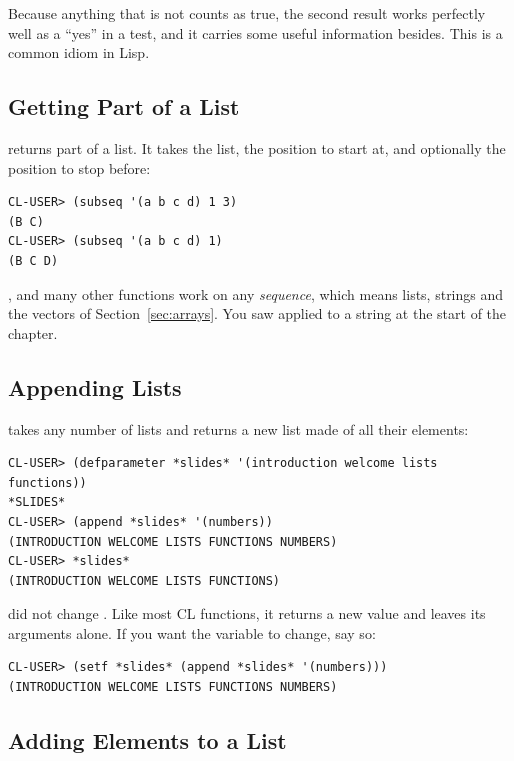 Because anything that is not  counts as true, the second
result works perfectly well as a ``yes'' in a test, and it carries
some useful information besides. This is a common idiom in Lisp.

\subsection{Getting Part of a List}

 returns part of a list. It takes the list, the
position to start at, and optionally the position to stop before:

\begin{verbatim}
CL-USER> (subseq '(a b c d) 1 3)
(B C)
CL-USER> (subseq '(a b c d) 1)
(B C D)
\end{verbatim}

,  and many other functions work on any
\emph{sequence}, which means lists, strings and the vectors of
Section~\ref{sec:arrays}. You saw  applied to a string
at the start of the chapter.

\subsection{Appending Lists}

 takes any number of lists and returns a new list made
of all their elements:

\begin{verbatim}
CL-USER> (defparameter *slides* '(introduction welcome lists functions))
*SLIDES*
CL-USER> (append *slides* '(numbers))
(INTRODUCTION WELCOME LISTS FUNCTIONS NUMBERS)
CL-USER> *slides*
(INTRODUCTION WELCOME LISTS FUNCTIONS)
\end{verbatim}

 did not change . Like most CL functions,
it returns a new value and leaves its arguments alone. If you want
the variable to change, say so:

\begin{verbatim}
CL-USER> (setf *slides* (append *slides* '(numbers)))
(INTRODUCTION WELCOME LISTS FUNCTIONS NUMBERS)
\end{verbatim}

\subsection{Adding Elements to a List}
\label{sec:cons}


